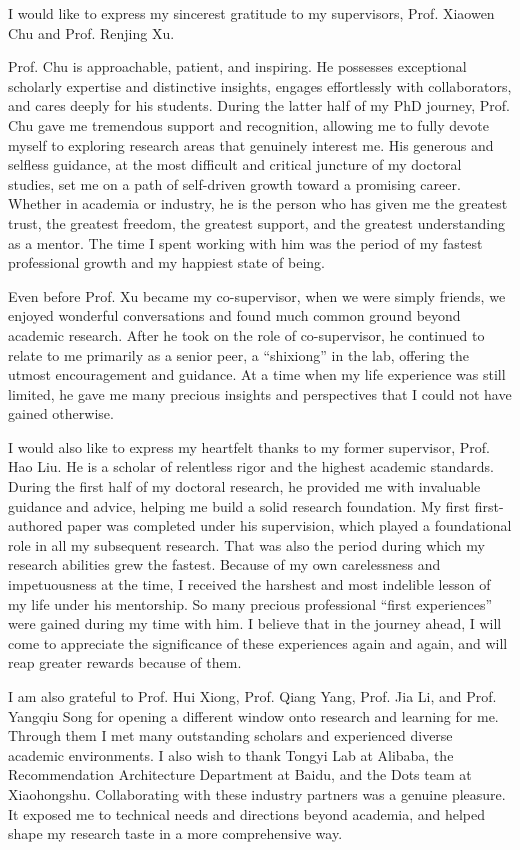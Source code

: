 I would like to express my sincerest gratitude to my supervisors, Prof. Xiaowen Chu and Prof. Renjing Xu.

Prof. Chu is approachable, patient, and inspiring. He possesses exceptional scholarly expertise and distinctive insights, engages effortlessly with collaborators, and cares deeply for his students. During the latter half of my PhD journey, Prof. Chu gave me tremendous support and recognition, allowing me to fully devote myself to exploring research areas that genuinely interest me. His generous and selfless guidance, at the most difficult and critical juncture of my doctoral studies, set me on a path of self-driven growth toward a promising career. Whether in academia or industry, he is the person who has given me the greatest trust, the greatest freedom, the greatest support, and the greatest understanding as a mentor. The time I spent working with him was the period of my fastest professional growth and my happiest state of being.

Even before Prof. Xu became my co-supervisor, when we were simply friends, we enjoyed wonderful conversations and found much common ground beyond academic research. After he took on the role of co-supervisor, he continued to relate to me primarily as a senior peer, a ``shixiong'' in the lab, offering the utmost encouragement and guidance. At a time when my life experience was still limited, he gave me many precious insights and perspectives that I could not have gained otherwise.

I would also like to express my heartfelt thanks to my former supervisor, Prof. Hao Liu. He is a scholar of relentless rigor and the highest academic standards. During the first half of my doctoral research, he provided me with invaluable guidance and advice, helping me build a solid research foundation. My first first-authored paper was completed under his supervision, which played a foundational role in all my subsequent research. That was also the period during which my research abilities grew the fastest. Because of my own carelessness and impetuousness at the time, I received the harshest and most indelible lesson of my life under his mentorship. So many precious professional ``first experiences'' were gained during my time with him. I believe that in the journey ahead, I will come to appreciate the significance of these experiences again and again, and will reap greater rewards because of them.

I am also grateful to Prof. Hui Xiong, Prof. Qiang Yang, Prof. Jia Li, and Prof. Yangqiu Song for opening a different window onto research and learning for me. Through them I met many outstanding scholars and experienced diverse academic environments. I also wish to thank Tongyi Lab at Alibaba, the Recommendation Architecture Department at Baidu, and the Dots team at Xiaohongshu. Collaborating with these industry partners was a genuine pleasure. It exposed me to technical needs and directions beyond academia, and helped shape my research taste in a more comprehensive way.

